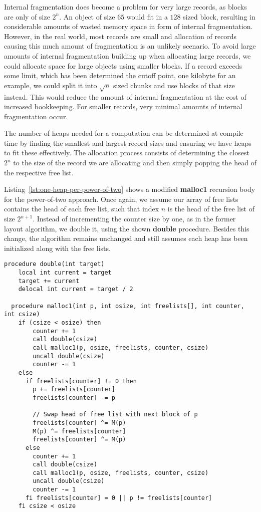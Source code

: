 Internal fragmentation does become a problem for very large records, as blocks are only of size $2^n$. An object of size $65$ would fit in a $128$ sized block, resulting in considerable amounts of wasted memory space in form of internal fragmentation. However, in the real world, most records are small and allocation of records causing this much amount of fragmentation is an unlikely scenario. To avoid large amounts of internal fragmentation building up when allocating large records, we could allocate space for large objects using smaller blocks. If a record exceeds some limit, which has been determined the cutoff point, one kilobyte for an example, we could split it into $\sqrt{n}$ sized chunks and use blocks of that size instead. This would reduce the amount of internal fragmentation at the cost of increased bookkeeping.
For smaller records, very minimal amounts of internal fragmentation occur. 

The number of heaps needed for a computation can be determined at compile time by finding the smallest and largest record sizes and ensuring we have heaps to fit these effectively. The allocation process consists of determining the closest $2^n$ to the size of the record we are allocating and then simply popping the head of the respective free list.

Listing~\ref{lst:one-heap-per-power-of-two} shows a modified \textbf{malloc1} recursion body for the power-of-two approach. Once again, we assume our array of free lists contains the head of each free list, such that index $n$ is the head of the free list of size $2^{n+1}$. Instead of incrementing the counter size by one, as in the former layout algorithm, we double it, using the shown \textbf{double} procedure. Besides this change, the algorithm remains unchanged and still assumes each heap has been initialized along with the free lists.\\

\begin{lstlisting}[caption={Allocation algorithm for one heap per power-of-two implemented in extended Janus}, language=janus, style=basic, label={lst:one-heap-per-power-of-two}]
  procedure double(int target)
    local int current = target
    target += current
    delocal int current = target / 2

  procedure malloc1(int p, int osize, int freelists[], int counter, int csize)
    if (csize < osize) then
        counter += 1
        call double(csize)
        call malloc1(p, osize, freelists, counter, csize) 
        uncall double(csize)
        counter -= 1
    else
      if freelists[counter] != 0 then
        p += freelists[counter]
        freelists[counter] -= p

        // Swap head of free list with next block of p
        freelists[counter] ^= M(p)
        M(p) ^= freelists[counter]
        freelists[counter] ^= M(p)
      else
        counter += 1
        call double(csize)
        call malloc1(p, osize, freelists, counter, csize)
        uncall double(csize)
        counter -= 1
      fi freelists[counter] = 0 || p != freelists[counter]
    fi csize < osize   
\end{lstlisting}


